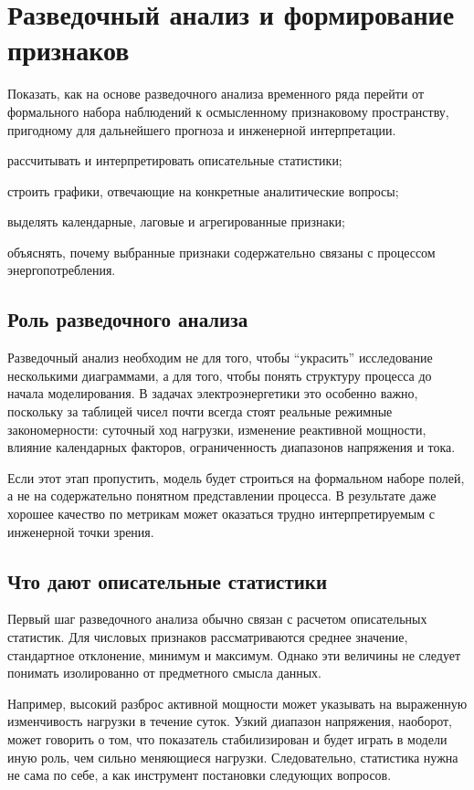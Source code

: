 \chapter{Разведочный анализ и формирование признаков}

\chaptergoals
  {Показать, как на основе разведочного анализа временного ряда перейти от формального набора наблюдений к осмысленному признаковому пространству, пригодному для дальнейшего прогноза и инженерной интерпретации.}
  {
    \item рассчитывать и интерпретировать описательные статистики;
    \item строить графики, отвечающие на конкретные аналитические вопросы;
    \item выделять календарные, лаговые и агрегированные признаки;
    \item объяснять, почему выбранные признаки содержательно связаны с процессом энергопотребления.
  }

\section{Роль разведочного анализа}

Разведочный анализ необходим не для того, чтобы ``украсить'' исследование несколькими диаграммами, а для того, чтобы понять структуру процесса до начала моделирования. В задачах электроэнергетики это особенно важно, поскольку за таблицей чисел почти всегда стоят реальные режимные закономерности: суточный ход нагрузки, изменение реактивной мощности, влияние календарных факторов, ограниченность диапазонов напряжения и тока.

Если этот этап пропустить, модель будет строиться на формальном наборе полей, а не на содержательно понятном представлении процесса. В результате даже хорошее качество по метрикам может оказаться трудно интерпретируемым с инженерной точки зрения.

\section{Что дают описательные статистики}

Первый шаг разведочного анализа обычно связан с расчетом описательных статистик. Для числовых признаков рассматриваются среднее значение, стандартное отклонение, минимум и максимум. Однако эти величины не следует понимать изолированно от предметного смысла данных.

Например, высокий разброс активной мощности может указывать на выраженную изменчивость нагрузки в течение суток. Узкий диапазон напряжения, наоборот, может говорить о том, что показатель стабилизирован и будет играть в модели иную роль, чем сильно меняющиеся нагрузки. Следовательно, статистика нужна не сама по себе, а как инструмент постановки следующих вопросов.

